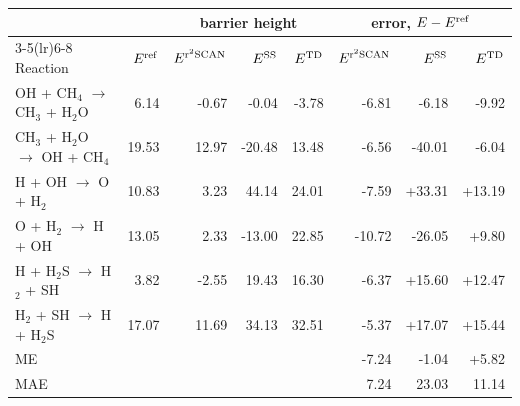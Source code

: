 \begin{tabular}{@{}l rrrr rrr@{}}
\toprule
 &  & \multicolumn{3}{c}{barrier height} & \multicolumn{3}{c}{error, $E-E^{\rm ref}$} \\
\cmidrule(lr){3-5}\cmidrule(lr){6-8}
Reaction & $E^{\rm ref}$ & $E^{{\rm r}^2{\rm SCAN}}$ & $E^{\rm SS}$ & $E^{\rm TD}$ & $E^{{\rm r}^2{\rm SCAN}}$ & $E^{\rm SS}$ & $E^{\rm TD}$ \\
\midrule
OH + CH$_4$ $\to$ CH$_3$ + H$_2$O & 6.14 & \textcolor{pyscfred}{-0.67} & \textcolor{pyscfred}{-0.04} & \textcolor{pyscfred}{-3.78} & \textcolor{pyscfred}{-6.81} & \textcolor{pyscfred}{-6.18} & \textcolor{pyscfred}{-9.92} \\
CH$_3$ + H$_2$O $\to$ OH + CH$_4$ & 19.53 & \textcolor{pyscfred}{12.97} & \textcolor{pyscfred}{-20.48} & \textcolor{pyscfred}{13.48} & \textcolor{pyscfred}{-6.56} & \textcolor{pyscfred}{-40.01} & \textcolor{pyscfred}{-6.04} \\
H + OH $\to$ O + H$_2$ & 10.83 & \textcolor{pyscfred}{3.23} & \textcolor{pyscfred}{44.14} & \textcolor{pyscfred}{24.01} & \textcolor{pyscfred}{-7.59} & \textcolor{pyscfred}{+33.31} & \textcolor{pyscfred}{+13.19} \\
O + H$_2$ $\to$ H + OH & 13.05 & \textcolor{pyscfred}{2.33} & \textcolor{pyscfred}{-13.00} & \textcolor{pyscfred}{22.85} & \textcolor{pyscfred}{-10.72} & \textcolor{pyscfred}{-26.05} & \textcolor{pyscfred}{+9.80} \\
H + H$_2$S $\to$ H$_2$ + SH & 3.82 & \textcolor{pyscfred}{-2.55} & \textcolor{pyscfred}{19.43} & \textcolor{pyscfred}{16.30} & \textcolor{pyscfred}{-6.37} & \textcolor{pyscfred}{+15.60} & \textcolor{pyscfred}{+12.47} \\
H$_2$ + SH $\to$ H + H$_2$S & 17.07 & \textcolor{pyscfred}{11.69} & \textcolor{pyscfred}{34.13} & \textcolor{pyscfred}{32.51} & \textcolor{pyscfred}{-5.37} & \textcolor{pyscfred}{+17.07} & \textcolor{pyscfred}{+15.44} \\
\midrule
ME &  &  &  &  & \textcolor{pyscfred}{-7.24} & \textcolor{pyscfred}{-1.04} & \textcolor{pyscfred}{+5.82} \\
MAE &  &  &  &  & \textcolor{pyscfred}{7.24} & \textcolor{pyscfred}{23.03} & \textcolor{pyscfred}{11.14} \\
\bottomrule
\end{tabular}
